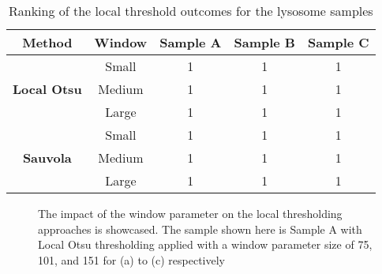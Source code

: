 \begin{table}
    \centering
    \begin{tabular}{ccccc}
    \hline
    \textbf{Method} & \textbf{Window} & \textbf{Sample A} & \textbf{Sample B} & \textbf{Sample C} \\ \hline
    \multirow{3}{*}{\textbf{Local Otsu}} & Small & 1 & 1 & 1 \\
    & Medium & 1 & 1 & 1 \\ & Large & 1 & 1 & 1 \\ \hline
    \multirow{3}{*}{\textbf{Sauvola}} & Small & 1 & 1 & 1 \\
    & Medium & 1 & 1 & 1 \\ & Large & 1 & 1 & 1 \\ \hline
    \end{tabular}
    \caption{Ranking of the local threshold outcomes for the lysosome samples}
    \label{tab:local_lyso_rankings}
\end{table}
\begin{figure}[h!]
    \centering
    \caption[The impact of the window parameter on the local thresholding approaches is showcased.]{The impact of the window parameter on the local thresholding approaches is showcased. The sample shown here is Sample A with Local Otsu thresholding applied with a window parameter size of 75, 101, and 151 for (a) to (c) respectively}
    \label{fig:window_parameter_explore}
\end{figure}

